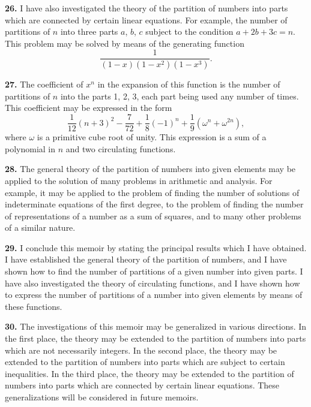 \documentclass[12pt,a4paper]{article}
\begin{document}
\textbf{26.} I have also investigated the theory of the partition of numbers into parts which are connected by certain linear equations. For example, the number of partitions of $n$ into three parts $a$, $b$, $c$ subject to the condition $a + 2b + 3c = n$. This problem may be solved by means of the generating function
\[
\frac{1}{(1-x)(1-x^2)(1-x^3)}.
\]

\newpage
\setcounter{page}{244}

\textbf{27.} The coefficient of $x^n$ in the expansion of this function is the number of partitions of $n$ into the parts 1, 2, 3, each part being used any number of times. This coefficient may be expressed in the form
\[
\frac{1}{12}(n+3)^2 - \frac{7}{72} + \frac{1}{8}(-1)^n + \frac{1}{9}\left(\omega^n + \omega^{2n}\right),
\]
where $\omega$ is a primitive cube root of unity. This expression is a sum of a polynomial in $n$ and two circulating functions.

\textbf{28.} The general theory of the partition of numbers into given elements may be applied to the solution of many problems in arithmetic and analysis. For example, it may be applied to the problem of finding the number of solutions of indeterminate equations of the first degree, to the problem of finding the number of representations of a number as a sum of squares, and to many other problems of a similar nature.

\textbf{29.} I conclude this memoir by stating the principal results which I have obtained. I have established the general theory of the partition of numbers, and I have shown how to find the number of partitions of a given number into given parts. I have also investigated the theory of circulating functions, and I have shown how to express the number of partitions of a number into given elements by means of these functions.

\newpage
\setcounter{page}{245}

\textbf{30.} The investigations of this memoir may be generalized in various directions. In the first place, the theory may be extended to the partition of numbers into parts which are not necessarily integers. In the second place, the theory may be extended to the partition of numbers into parts which are subject to certain inequalities. In the third place, the theory may be extended to the partition of numbers into parts which are connected by certain linear equations. These generalizations will be considered in future memoirs.

\newpage
\setcounter{page}{246}
\end{document}
